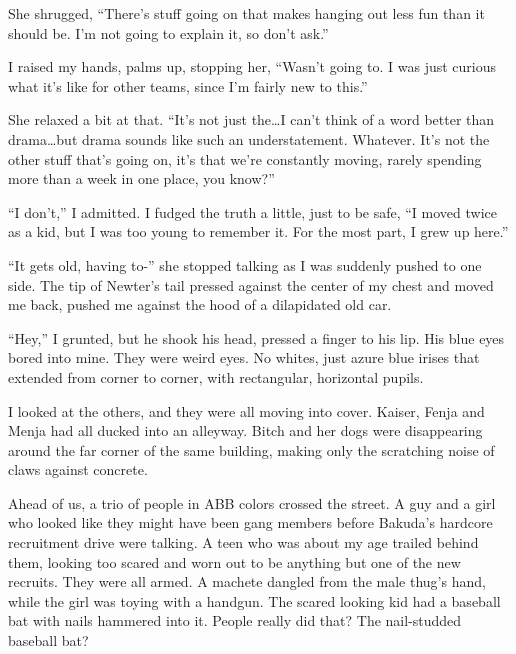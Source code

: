 She shrugged, ``There's stuff going on that makes hanging out less fun than it should be.  I'm not going to explain it, so don't ask.''



I raised my hands, palms up, stopping her, ``Wasn't going to.  I was just curious what it's like for other teams, since I'm fairly new to this.''



She relaxed a bit at that.  ``It's not just the\ldots I can't think of a word better than drama\ldots but drama sounds like such an understatement.  Whatever.  It's not the other stuff that's going on, it's that we're constantly moving, rarely spending more than a week in one place, you know?''



``I don't,'' I admitted.  I fudged the truth a little, just to be safe, ``I moved twice as a kid, but I was too young to remember it.  For the most part, I grew up here.''



``It gets old, having to-'' she stopped talking as I was suddenly pushed to one side.  The tip of Newter's tail pressed against the center of my chest and moved me back, pushed me against the hood of a dilapidated old car.



``Hey,'' I grunted, but he shook his head, pressed a finger to his lip.  His blue eyes bored into mine.  They were weird eyes.  No whites, just azure blue irises that extended from corner to corner, with rectangular, horizontal pupils.



I looked at the others, and they were all moving into cover.  Kaiser, Fenja and Menja had all ducked into an alleyway.  Bitch and her dogs were disappearing around the far corner of the same building, making only the scratching noise of claws against concrete.



Ahead of us, a trio of people in ABB colors crossed the street.  A guy and a girl who looked like they might have been gang members before Bakuda's hardcore recruitment drive were talking.  A teen who was about my age trailed behind them, looking too scared and worn out to be anything but one of the new recruits.  They were all armed.  A machete dangled from the male thug's hand, while the girl was toying with a handgun.  The scared looking kid had a baseball bat with nails hammered into it.  People really did that?  The nail-studded baseball bat?




